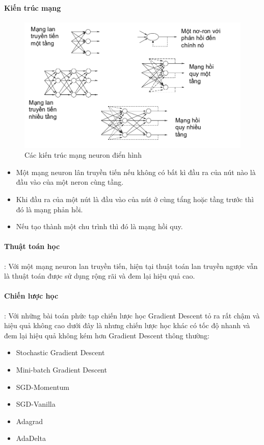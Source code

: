 \documentclass[a4paper,12pt]{report}
\begin{document}
\paragraph{Kiến trúc mạng} 
\begin{figure}[H]
\includegraphics[scale=0.45]{archneuron.png}
\caption{Các kiến trúc mạng neuron điển hình}
\end{figure}
\begin{itemize}
\item Một mạng neuron lân truyền tiến nếu không có bất kì đầu ra của nút nào là đầu vào của một neron cùng tầng.
\item Khi đầu ra của một nút là đầu vào của nút ở cùng tẩng hoặc tầng trước thì đó là mạng phản hồi.
\item Nếu tạo thành một chu trình thì đó là mạng hồi quy.
\end{itemize}
\paragraph{Thuật toán học}:  Với một mạng neuron lan truyền tiến, hiện tại thuật toán lan truyền ngược vẫn là thuật toán được sử dụng rộng rãi và đem lại hiệu quả cao.

\paragraph{Chiến lược học}: 
Với những bài toán phức tạp chiến lược học Gradient Descent tỏ ra rất chậm và hiệu quả không cao dưới đây là nhưng chiến lược học khác có tốc độ nhanh và đem lại hiệu quả không kém hơn Gradient Descent thông thường:
\begin{itemize}
\item Stochastic Gradient Descent
\item Mini-batch Gradient Descent
\item SGD-Momentum
\item SGD-Vanilla
\item Adagrad
\item AdaDelta
\end{itemize}
\end{document}
